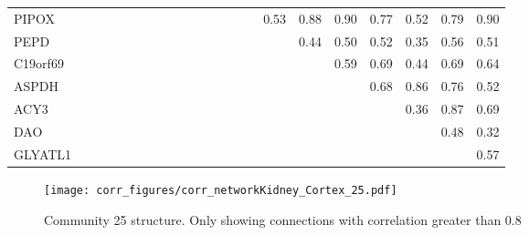 \begin{longtable}{lrrrrrrrrrrrrrrrrrrrrr}
PIPOX    &            &             &            &              &             &            &              &            &             &            &             &           &              &             &       0.53 &           0.88 &        0.90 &       0.77 &      0.52 &          0.79 &        0.90 \\
PEPD     &            &             &            &              &             &            &              &            &             &            &             &           &              &             &            &           0.44 &        0.50 &       0.52 &      0.35 &          0.56 &        0.51 \\
C19orf69 &            &             &            &              &             &            &              &            &             &            &             &           &              &             &            &                &        0.59 &       0.69 &      0.44 &          0.69 &        0.64 \\
ASPDH    &            &             &            &              &             &            &              &            &             &            &             &           &              &             &            &                &             &       0.68 &      0.86 &          0.76 &        0.52 \\
ACY3     &            &             &            &              &             &            &              &            &             &            &             &           &              &             &            &                &             &            &      0.36 &          0.87 &        0.69 \\
DAO      &            &             &            &              &             &            &              &            &             &            &             &           &              &             &            &                &             &            &           &          0.48 &        0.32 \\
GLYATL1  &            &             &            &              &             &            &              &            &             &            &             &           &              &             &            &                &             &            &           &               &        0.57 \\
\end{longtable}


\begin{figure}[h!]
\centering
\texttt{[image: corr\_figures/corr\_networkKidney\_Cortex\_25.pdf]}
\caption{Community 25 structure. Only showing connections with correlation greater than 0.8}
\end{figure}




